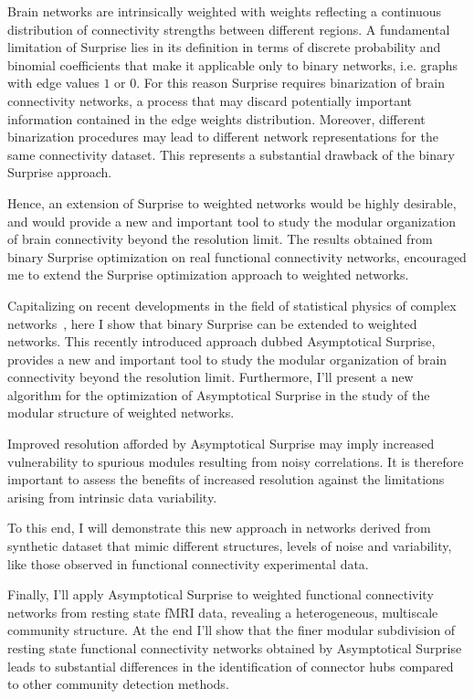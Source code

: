 Brain networks are intrinsically weighted with weights reflecting a continuous distribution of connectivity strengths between different regions.
A fundamental limitation of Surprise lies in its definition in terms of discrete probability and binomial coefficients that make it applicable only to binary networks, i.e.
graphs with edge values $1$ or $0$.
For this reason Surprise requires binarization of brain connectivity networks, a process that may discard potentially important information contained in the edge weights distribution.
Moreover, different binarization procedures may lead to different network representations for the same connectivity dataset.
This represents a substantial drawback of the binary Surprise approach.

Hence, an extension of Surprise to weighted networks would be highly desirable, and would provide a new and important tool to study the modular organization of brain connectivity beyond the resolution limit.
The results obtained from binary Surprise optimization on real functional connectivity networks, encouraged me to extend the Surprise optimization approach to weighted networks.

Capitalizing on recent developments in the field of statistical physics of complex networks~\cite{traag2015}, here I show that binary Surprise can be extended to weighted networks.
This recently introduced approach dubbed Asymptotical Surprise, provides a new and important tool to study the modular organization of brain connectivity beyond the resolution limit.
Furthermore, I'll present a new algorithm for the optimization of Asymptotical Surprise in the study of the modular structure of weighted networks.

Improved resolution afforded by Asymptotical Surprise may imply increased vulnerability to spurious modules resulting from noisy correlations.
It is therefore important to assess the benefits of increased resolution against the limitations arising from intrinsic data variability.

To this end, I will demonstrate this new approach in networks derived from synthetic dataset that mimic different structures, levels of noise and variability, like those observed in functional connectivity experimental data.

Finally, I'll apply Asymptotical Surprise to weighted functional connectivity networks from resting state fMRI data, revealing a heterogeneous, multiscale community structure.
At the end I'll show that the finer modular subdivision of resting state functional connectivity networks obtained by Asymptotical Surprise leads to substantial differences in the identification of connector hubs compared to other community detection methods.

